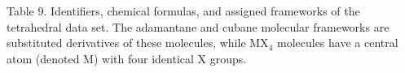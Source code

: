 \documentclass{article}
\begin{document}
% 
% 



\thispagestyle{empty}

Table 9. Identifiers, chemical formulas, and assigned frameworks of the tetrahedral data
set. The adamantane and cubane molecular frameworks are substituted derivatives
of these molecules, while MX$_4$ molecules have a central atom (denoted M) with
four identical X groups. \tiny %
\end{document}
